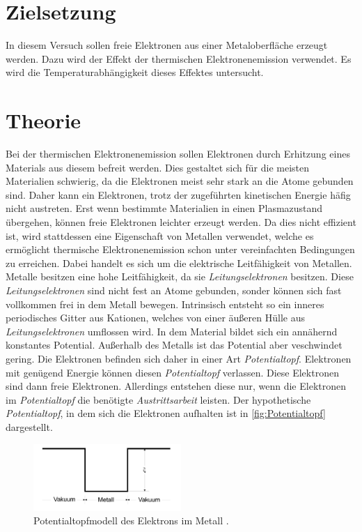 \section{Zielsetzung}
\label{sec:Ziel}
In diesem Versuch sollen freie Elektronen aus einer Metaloberfläche erzeugt werden. Dazu wird der Effekt der thermischen Elektronenemission verwendet. Es wird die 
Temperaturabhängigkeit dieses Effektes untersucht. 

\section{Theorie}
\label{sec:Theorie}
Bei der thermischen Elektronenemission sollen Elektronen durch Erhitzung eines Materials aus diesem befreit werden. Dies gestaltet sich für die meisten Materialien 
schwierig, da die Elektronen meist sehr stark an die Atome gebunden sind. Daher kann ein Elektronen, trotz der zugeführten kinetischen Energie häfig nicht austreten. 
Erst wenn bestimmte Materialien in einen Plasmazustand übergehen, können freie Elektronen leichter erzeugt werden. Da dies nicht effizient ist, wird stattdessen eine Eigenschaft
von Metallen verwendet, welche es ermöglicht thermische Elektronenemission schon unter vereinfachten Bedingungen zu erreichen. Dabei handelt es sich um die elektrische 
Leitfähigkeit von Metallen. Metalle besitzen eine hohe Leitfähigkeit, da sie \textit{Leitungselektronen} besitzen. Diese \textit{Leitungselektronen} sind nicht fest an 
Atome gebunden, sonder können sich fast vollkommen frei in dem Metall bewegen. Intrinsisch entsteht so ein inneres periodisches Gitter aus Kationen, welches von einer äußeren
Hülle aus \textit{Leitungselektronen} umflossen wird. 
In dem Material bildet sich ein annähernd konstantes Potential. Außerhalb des Metalls ist das Potential aber veschwindet gering. Die Elektronen befinden sich daher in einer Art
\textit{Potentialtopf}. Elektronen mit genügend Energie können diesen \textit{Potentialtopf} verlassen. Diese Elektronen sind dann freie Elektronen. Allerdings entstehen diese 
nur, wenn die Elektronen im \textit{Potentialtopf} die benötigte \textit{Austrittsarbeit} leisten.
Der hypothetische \textit{Potentialtopf}, in dem sich die Elektronen aufhalten ist in \autoref{fig:Potentialtopf} dargestellt.
\begin{figure}
    \centering
    \includegraphics[width = 0.5\textwidth]{content/Potentialtopf.png}
    \caption{Potentialtopfmodell des Elektrons im Metall \cite{v504}.}
    \label{fig:Potentialtopf}
\end{figure}

